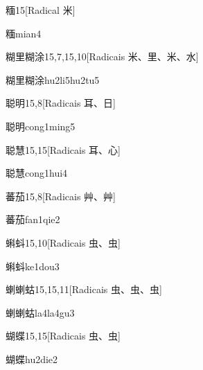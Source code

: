 \begin{entry}{糆}{15}[Radical ⽶]
  \begin{phonetics}{糆}{mian4}
  \end{phonetics}
\end{entry}

\begin{entry}{糊里糊涂}{15,7,15,10}[Radicais ⽶、⾥、⽶、⽔]
  \begin{phonetics}{糊里糊涂}{hu2li5hu2tu5}
  \end{phonetics}
\end{entry}

\begin{entry}{聪明}{15,8}[Radicais ⽿、⽇]
  \begin{phonetics}{聪明}{cong1ming5}
  \end{phonetics}
\end{entry}

\begin{entry}{聪慧}{15,15}[Radicais ⽿、⼼]
  \begin{phonetics}{聪慧}{cong1hui4}
  \end{phonetics}
\end{entry}

\begin{entry}{蕃茄}{15,8}[Radicais ⾋、⾋]
  \begin{phonetics}{蕃茄}{fan1qie2}
  \end{phonetics}
\end{entry}

\begin{entry}{蝌蚪}{15,10}[Radicais ⾍、⾍]
  \begin{phonetics}{蝌蚪}{ke1dou3}
  \end{phonetics}
\end{entry}

\begin{entry}{蝲蝲蛄}{15,15,11}[Radicais ⾍、⾍、⾍]
  \begin{phonetics}{蝲蝲蛄}{la4la4gu3}
  \end{phonetics}
\end{entry}

\begin{entry}{蝴蝶}{15,15}[Radicais ⾍、⾍]
  \begin{phonetics}{蝴蝶}{hu2die2}
  \end{phonetics}
\end{entry}

